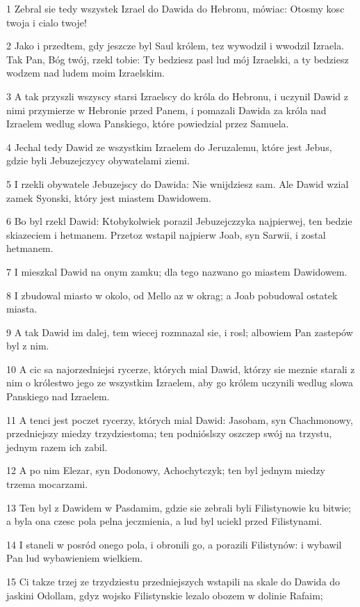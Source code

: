 \par 1 Zebral sie tedy wszystek Izrael do Dawida do Hebronu, mówiac: Otosmy kosc twoja i cialo twoje!
\par 2 Jako i przedtem, gdy jeszcze byl Saul królem, tez wywodzil i wwodzil Izraela. Tak Pan, Bóg twój, rzekl tobie: Ty bedziesz pasl lud mój Izraelski, a ty bedziesz wodzem nad ludem moim Izraelskim.
\par 3 A tak przyszli wszyscy starsi Izraelscy do króla do Hebronu, i uczynil Dawid z nimi przymierze w Hebronie przed Panem, i pomazali Dawida za króla nad Izraelem wedlug slowa Panskiego, które powiedzial przez Samuela.
\par 4 Jechal tedy Dawid ze wszystkim Izraelem do Jeruzalemu, które jest Jebus, gdzie byli Jebuzejczycy obywatelami ziemi.
\par 5 I rzekli obywatele Jebuzejscy do Dawida: Nie wnijdziesz sam. Ale Dawid wzial zamek Syonski, który jest miastem Dawidowem.
\par 6 Bo byl rzekl Dawid: Ktobykolwiek porazil Jebuzejczzyka najpierwej, ten bedzie skiazeciem i hetmanem. Przetoz wstapil najpierw Joab, syn Sarwii, i zostal hetmanem.
\par 7 I mieszkal Dawid na onym zamku; dla tego nazwano go miastem Dawidowem.
\par 8 I zbudowal miasto w okolo, od Mello az w okrag; a Joab pobudowal ostatek miasta.
\par 9 A tak Dawid im dalej, tem wiecej rozmnazal sie, i rosl; albowiem Pan zastepów byl z nim.
\par 10 A cic sa najorzedniejsi rycerze, których mial Dawid, którzy sie meznie starali z nim o królestwo jego ze wszystkim Izraelem, aby go królem uczynili wedlug slowa Panskiego nad Izraelem.
\par 11 A tenci jest poczet rycerzy, których mial Dawid: Jasobam, syn Chachmonowy, przedniejszy miedzy trzydziestoma; ten podnióslszy oszczep swój na trzystu, jednym razem ich zabil.
\par 12 A po nim Elezar, syn Dodonowy, Achochytczyk; ten byl jednym miedzy trzema mocarzami.
\par 13 Ten byl z Dawidem w Pasdamim, gdzie sie zebrali byli Filistynowie ku bitwie; a byla ona czesc pola pelna jeczmienia, a lud byl uciekl przed Filistynami.
\par 14 I staneli w posród onego pola, i obronili go, a porazili Filistynów: i wybawil Pan lud wybawieniem wielkiem.
\par 15 Ci takze trzej ze trzydziestu przedniejszych wstapili na skale do Dawida do jaskini Odollam, gdyz wojsko Filistynskie lezalo obozem w dolinie Rafaim;
